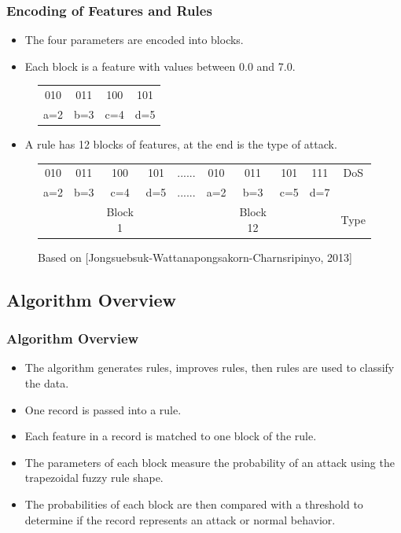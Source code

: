 \documentclass{beamer}
\begin{document}
\begin{frame}
	\frametitle{Encoding of Features and Rules}
	\begin{itemize}
	\item The four parameters are encoded into blocks.
	\item Each block is a feature with values between 0.0 and 7.0.
	\end{itemize}
	
\begin{figure}
\begin{tabular}{|cccc|} \hline
010 & 011 & 100 & 101\\
a=2 & b=3 & c=4 & d=5\\
\hline\end{tabular}
\end{figure}

	\begin{itemize}
	\item A rule has 12 blocks of features, at the end is the type of attack.
	\end{itemize}

\begin{figure}
\begin{small}
\begin{tabular}{|cccc|c|cccc|c|} \hline
010 & 011 & 100 & 101   & ...... & 010 & 011 & 101 & 111   & DoS\\
a=2 & b=3 & c=4 & d=5   & ...... & a=2 & b=3 & c=5 & d=7   &\\ 
    &     & Block 1&    &        &     & Block 12& &       & Type\\
\hline\end{tabular}
\caption{Based on [Jongsuebsuk-Wattanapongsakorn-Charnsripinyo, 2013]}
\end{small}
\end{figure}

\end{frame}


\subsection{Algorithm Overview}

\begin{frame}
	\frametitle{Algorithm Overview}
	\begin{itemize}
		\item The algorithm generates rules, improves rules, then rules are used to classify the data.
		\item One record is passed into a rule.
		\item Each feature in a record is matched to one block of the rule.
		\item The parameters of each block measure the probability of an attack using the trapezoidal fuzzy rule shape.
		\item The probabilities of each block are then compared with a threshold to determine if the record represents an attack or normal behavior.
	\end{itemize}
\end{frame}
\end{document}
